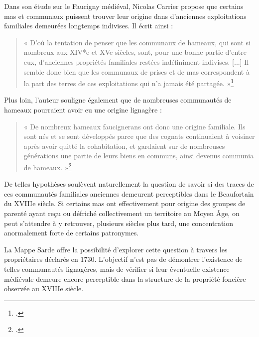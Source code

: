 \documentclass[12pt,a4paper]{report}
\begin{document}
Dans son étude sur le Faucigny médiéval, Nicolas Carrier propose que certains mas et communaux puissent trouver leur origine dans d'anciennes exploitations familiales demeurées longtemps indivises. Il écrit ainsi :

\begin{quote}
	« D’où la tentation de penser que les communaux de hameaux, qui sont si nombreux aux XIV\**e et XVe siècles, sont, pour une bonne partie d’entre eux, d’anciennes propriétés familiales restées indéfiniment indivises. [...] Il semble donc bien que les communaux de prises et de mas correspondent à la part des terres de ces exploitations qui n’a jamais été partagée. »\footcite[247]{Carrier2001VieMontagnardeFaucigny}
\end{quote}

Plus loin, l'auteur souligne également que de nombreuses communautés de hameaux pourraient avoir eu une origine lignagère :

\begin{quote}
	« De nombreux hameaux faucignerans ont donc une origine familiale. Ils sont nés et se sont développés parce que des cognats continuaient à voisiner après avoir quitté la cohabitation, et gardaient sur de nombreuses générations une partie de leurs biens en communs, ainsi devenus communia de hameaux. »\footcite[247-248]{Carrier2001VieMontagnardeFaucigny}
\end{quote}

De telles hypothèses soulèvent naturellement la question de savoir si des traces de ces communautés familiales anciennes demeurent perceptibles dans le Beaufortain du XVIIIe siècle. Si certains mas ont effectivement pour origine des groupes de parenté ayant reçu ou défriché collectivement un territoire au Moyen Âge, on peut s'attendre à y retrouver, plusieurs siècles plus tard, une concentration anormalement forte de certains patronymes.

La Mappe Sarde offre la possibilité d'explorer cette question à travers les propriétaires déclarés en 1730. L'objectif n'est pas de démontrer l'existence de telles communautés lignagères, mais de vérifier si leur éventuelle existence médiévale demeure encore perceptible dans la structure de la propriété foncière observée au XVIIIe siècle.

\begin{table}[H]
	\centering
	 \resizebox{0.6\textwidth}{!}{%
	 	
	}
	\caption{Principaux patronymes et répartition par mas}
	\label{tab:PatronymesMas}
\end{table}
\end{document}
